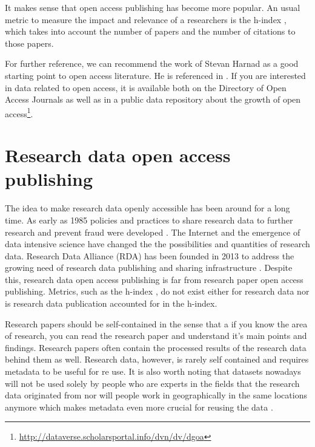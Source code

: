 It makes sense that open access publishing has become more popular. An usual
metric to measure the impact and relevance of a researchers is the h-index
\cite{DBLP:journals/scientometrics/Hirsch10}, which takes into account the
number of papers and the number of citations to those papers.

For further reference, we can recommend the work of Stevan Harnad as a good
starting point to open access literature. He is referenced in
\cite{DBLP:journals/corr/abs-cs-0606079, harnad2004comparing, harnad2004access}. If you are interested in data related to open access,
it is available both on the Directory of Open Access Journals as well as in a
public data repository about the growth of open
access\footnote{\url{http://dataverse.scholarsportal.info/dvn/dv/dgoa}}.

\section{Research data open access publishing}
\label{sec:research_data_oa}

The idea to make research data openly accessible has been around for a long
time. As early as 1985 policies and practices to share research data to further
research and prevent fraud were developed \cite{fienberg1985sharing}.
The Internet and the emergence of data intensive science have changed the the
possibilities and quantities of research data. Research Data Alliance (RDA)
has been founded in 2013 to address the growing need of research data
publishing and sharing infrastructure
\cite{DBLP:journals/dlib/BermanWW14, DBLP:books/ms/4paradigm09}. Despite this,
research data open access publishing is far from research paper open access
publishing. Metrics, such as the h-index
\cite{DBLP:journals/scientometrics/Hirsch10}, do not exist either for research
data nor is research data publication accounted for in the h-index.

Research papers should be self-contained in the sense that a if you know the
area of research, you can read the research paper and understand it's main
points and findings. Research papers often contain the processed results of the research data
behind them as well. Research data, however, is rarely self contained and
requires metadata to be useful for re use. It is also worth noting that datasets
nowadays will not be used solely by people who are experts in the fields that
the research data originated from nor will people work in geographically in the
same locations anymore which makes metadata even more crucial for reusing the
data \cite{DBLP:journals/jbi/HarrisTTPGC09, DBLP:journals/jasis/Borgman12}.


